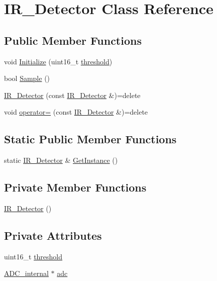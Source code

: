 \hypertarget{class_i_r___detector}{}\section{I\+R\+\_\+\+Detector Class Reference}
\label{class_i_r___detector}
\subsection*{Public Member Functions}
\begin{DoxyCompactItemize}
\item 
void \hyperlink{class_i_r___detector_ae42dc3f8e68efc44e95b3931347b3a2c}{Initialize} (uint16\+\_\+t \hyperlink{class_i_r___detector_a8979f7f20da68ca44d7ea1fe43b2f986}{threshold})
\item 
bool \hyperlink{class_i_r___detector_aca18cc0350105dfa2395cd2da6e8d05f}{Sample} ()
\item 
\hyperlink{class_i_r___detector_aee7ffc5bae132f38a647a91fc2803b96}{I\+R\+\_\+\+Detector} (const \hyperlink{class_i_r___detector}{I\+R\+\_\+\+Detector} \&)=delete
\item 
void \hyperlink{class_i_r___detector_a8359f3a2fdc9cee0e1bc8da50b5de4e0}{operator=} (const \hyperlink{class_i_r___detector}{I\+R\+\_\+\+Detector} \&)=delete
\end{DoxyCompactItemize}
\subsection*{Static Public Member Functions}
\begin{DoxyCompactItemize}
\item 
static \hyperlink{class_i_r___detector}{I\+R\+\_\+\+Detector} \& \hyperlink{class_i_r___detector_a5d7d49b666f9ec72f997c804774e4013}{Get\+Instance} ()
\end{DoxyCompactItemize}
\subsection*{Private Member Functions}
\begin{DoxyCompactItemize}
\item 
\hyperlink{class_i_r___detector_a6c051938cb1521fff4038e81957967e5}{I\+R\+\_\+\+Detector} ()
\end{DoxyCompactItemize}
\subsection*{Private Attributes}
\begin{DoxyCompactItemize}
\item 
uint16\+\_\+t \hyperlink{class_i_r___detector_a8979f7f20da68ca44d7ea1fe43b2f986}{threshold}
\item 
\hyperlink{class_a_d_c__internal}{A\+D\+C\+\_\+internal} $\ast$ \hyperlink{class_i_r___detector_a33883224e6f643d3ece54a3c603b92e4}{adc}
\end{DoxyCompactItemize}


